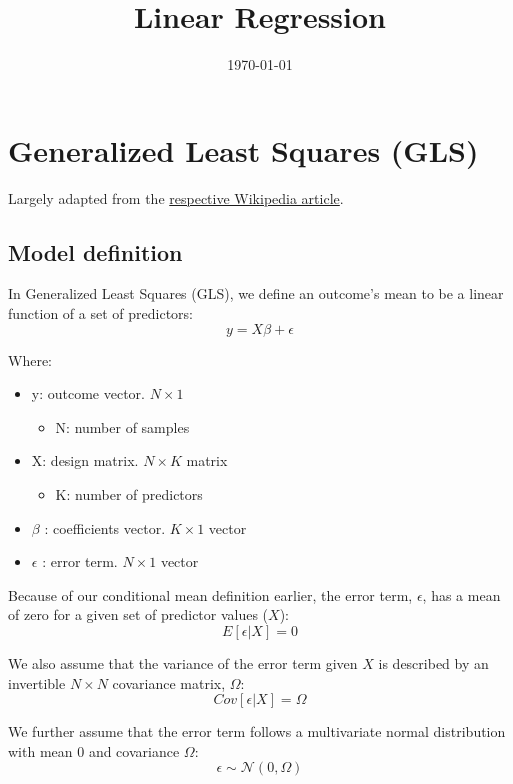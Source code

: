 \documentclass[12pt]{article}
\title{Linear Regression}
\date{\today}
\begin{document}
\maketitle

\section{Generalized Least Squares (GLS)}

Largely adapted from the \href{https://en.wikipedia.org/wiki/Generalized_least_squares}{respective Wikipedia article}.

\subsection{Model definition}

In Generalized Least Squares (GLS), we define an outcome's mean to be a linear function of a set of predictors:
$$ y = X \beta + \epsilon $$

Where:

\begin{itemize}
    \item y: outcome vector. $N \times 1$
    \begin{itemize}
        \item N: number of samples
    \end{itemize}
    \item X: design matrix. $N \times K$ matrix
    \begin{itemize}
        \item K: number of predictors
    \end{itemize}
    \item $\beta$ : coefficients vector. $K \times 1$ vector
    \item $\epsilon$ : error term. $N \times 1$ vector
\end{itemize}

Because of our conditional mean definition earlier, the error term, $\epsilon$, has a mean of zero for a given set of predictor values ($X$):
$$ E [\epsilon | X ] = 0 $$

We also assume that the variance of the error term given $X$ is described by an invertible $N \times N$ covariance matrix, $\Omega$:
$$ Cov[ \epsilon | X ] = \Omega $$

We further assume that the error term follows a multivariate normal distribution with mean 0 and covariance $\Omega$:
$$ \epsilon \sim \mathcal{N} (0, \Omega) $$
\end{document}
